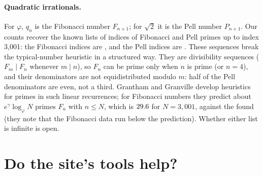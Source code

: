 \paragraph{Quadratic irrationals.} For $\varphi$, $q_n$ is the Fibonacci number $F_{n+1}$; for $\sqrt 2$ it is the Pell number $P_{n+1}$. Our counts recover the known lists of indices of Fibonacci and Pell primes \citep{OEIS_A001605,OEIS_A096650} up to index 3{,}001: the Fibonacci indices are \PhiFibIdx, and the Pell indices are \RootPellIdx. These sequences break the typical-number heuristic in a structured way. They are divisibility sequences ($F_m \mid F_n$ whenever $m \mid n$), so $F_n$ can be prime only when $n$ is prime (or $n = 4$), and their denominators are not equidistributed modulo $m$: half of the Pell denominators are even, not a third. Grantham and Granville \citep{GranthamGranville2024} develop heuristics for primes in such linear recurrences; for Fibonacci numbers they predict about $e^{\gamma}\log_\varphi N$ primes $F_n$ with $n \le N$, which is $29.6$ for $N = 3{,}001$, against the \PhiQPrimes{} found (they note that the Fibonacci data run below the prediction). Whether either list is infinite is open.

\section{Do the site's tools help?}

